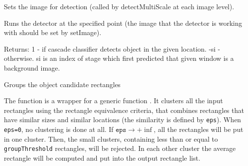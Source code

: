 Sets the image for detection (called by detectMultiScale at each image level).


\begin{description}
\end{description}

Runs the detector at the specified point (the image that the detector is working with should be set by setImage).


\begin{description}
\end{description}
Returns:
1 - if cascade classifier detects object in the given location.
-si - otherwise. si is an index of stage which first predicted that given window is a background image.

Groups the object candidate rectangles

\begin{description}
\end{description}

The function is a wrapper for a generic function . It clusters all the input rectangles using the rectangle equivalence criteria, that combines rectangles that have similar sizes and similar locations (the similarity is defined by \texttt{eps}). When \texttt{eps=0}, no clustering is done at all. If $\texttt{eps}\rightarrow +\inf$, all the rectangles will be put in one cluster. Then, the small clusters, containing less than or equal to \texttt{groupThreshold} rectangles, will be rejected. In each other cluster the average rectangle will be computed and put into the output rectangle list.  
\fi
